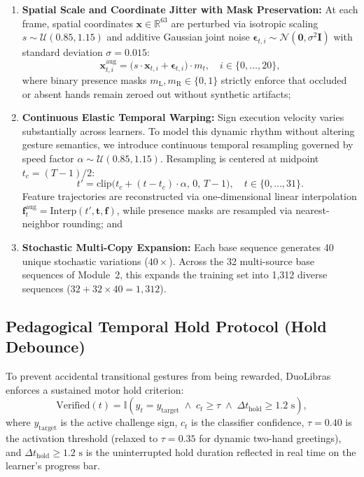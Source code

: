 \documentclass[12pt,a4paper]{article}
\begin{document}
\begin{enumerate}
    \item \textbf{Spatial Scale and Coordinate Jitter with Mask Preservation:} At each frame, spatial coordinates $\mathbf{x} \in \mathbb{R}^{63}$ are perturbed via isotropic scaling $s \sim \mathcal{U}(0.85, 1.15)$ and additive Gaussian joint noise $\boldsymbol{\epsilon}_{t,i} \sim \mathcal{N}(\mathbf{0}, \sigma^2 \mathbf{I})$ with standard deviation $\sigma = 0.015$:
    \begin{equation}
        \mathbf{x}_{t,i}^{\text{aug}} = \Big( s \cdot \mathbf{x}_{t,i} + \boldsymbol{\epsilon}_{t,i} \Big) \cdot m_t, \quad i \in \{0, \dots, 20\},
        \label{eq:spatial_aug}
    \end{equation}
    where binary presence masks $m_{\text{L}}, m_{\text{R}} \in \{0, 1\}$ strictly enforce that occluded or absent hands remain zeroed out without synthetic artifacts;

    \item \textbf{Continuous Elastic Temporal Warping:} Sign execution velocity varies substantially across learners. To model this dynamic rhythm without altering gesture semantics, we introduce continuous temporal resampling governed by speed factor $\alpha \sim \mathcal{U}(0.85, 1.15)$. Resampling is centered at midpoint $t_c = (T - 1)/2$:
    \begin{equation}
        t' = \text{clip}\big( t_c + (t - t_c) \cdot \alpha,\, 0,\, T - 1 \big), \quad t \in \{0, \dots, 31\}.
        \label{eq:temporal_warp}
    \end{equation}
    Feature trajectories are reconstructed via one-dimensional linear interpolation $\mathbf{f}_t^{\text{aug}} = \text{Interp}(t', \mathbf{t}, \mathbf{f})$, while presence masks are resampled via nearest-neighbor rounding; and

    \item \textbf{Stochastic Multi-Copy Expansion:} Each base sequence generates 40 unique stochastic variations ($40\times$). Across the 32 multi-source base sequences of Module~2, this expands the training set into 1,312 diverse sequences ($32 + 32 \times 40 = 1{,}312$).
\end{enumerate}
\subsection{Pedagogical Temporal Hold Protocol (Hold Debounce)}

To prevent accidental transitional gestures from being rewarded, DuoLibras enforces a sustained motor hold criterion:
\begin{equation}
    \text{Verified}(t) = \mathbb{I}\!\left(\hat{y}_t = y_{\text{target}} \;\wedge\; c_t \ge \tau \;\wedge\; \Delta t_{\text{hold}} \ge 1.2\text{ s}\right),
    \label{eq:hold}
\end{equation}
where $y_{\text{target}}$ is the active challenge sign, $c_t$ is the classifier confidence, $\tau = 0.40$ is the activation threshold (relaxed to $\tau = 0.35$ for dynamic two-hand greetings), and $\Delta t_{\text{hold}} \ge 1.2\text{ s}$ is the uninterrupted hold duration reflected in real time on the learner's progress bar.
\end{document}
